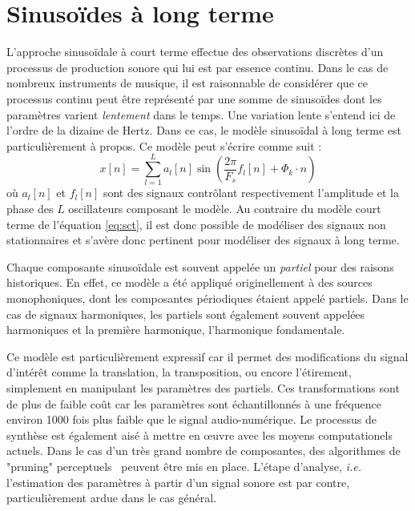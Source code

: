 
\section{ \nmu Sinusoïdes à long terme}  \label{sec:slt}

L'approche sinusoïdale à court terme effectue des observations discrètes d'un processus de production sonore qui lui est par essence continu. Dans le cas de nombreux instruments de musique, il est raisonnable de considérer que ce processus continu peut être représenté par une somme de sinusoïdes dont les paramètres varient \textsl{lentement} dans le temps. Une variation lente s'entend ici de l'ordre de la dizaine de Hertz. Dans ce cas, le modèle sinusoïdal à long terme est particulièrement à propos. Ce modèle peut s'écrire comme suit :
\begin{equation}
x[n]=\sum_{l=1}^{L} a_{l}[n] \sin \left(\frac{2 \pi}{F_{s}} f_{l}[n] + \Phi_k \cdot n\right)
\label{eq:slt}
\end{equation}
où $a_{l}[n]$ et $f_{l}[n]$ sont des signaux contrôlant respectivement l'amplitude et la phase des $L$ oscillateurs composant le modèle. Au contraire du modèle court terme de l'équation \ref{eq:sct}, il est donc possible de modéliser des signaux non stationnaires et s'avère donc pertinent pour modéliser des signaux à long terme.

Chaque composante sinusoïdale est souvent appelée un \textsl{partiel} pour des raisons historiques. En effet, ce modèle a été appliqué originellement à des sources monophoniques, dont les composantes périodiques étaient appelé partiels. Dans le cas de signaux harmoniques, les partiels sont également souvent appelées harmoniques et la première harmonique, l'harmonique fondamentale.

Ce modèle est particulièrement expressif car il permet des modifications du signal d'intérêt comme la translation, la transposition, ou encore l'étirement, simplement en manipulant les paramètres des partiels. Ces transformations sont de plus de faible coût car les paramètres sont échantillonnés à une fréquence environ 1000 fois plus faible que le signal audio-numérique. Le processus de synthèse est également aisé à mettre en \oe{}uvre avec les moyens computationels actuels. Dans le cas d'un très grand nombre de composantes, des algorithmes de "pruning" perceptuels~\cite{lagrangeDafx01} peuvent être mis en place. L'étape d'analyse, \textit{i.e.} l'estimation des paramètres à partir d'un signal sonore est par contre, particulièrement ardue dans le cas général.


